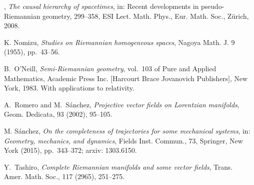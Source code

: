 \documentclass[reqno,10pt]{amsart}
\begin{document}
\begin{thebibliography}{10}
, {\em The causal hierarchy of spacetimes}, in: Recent developments in pseudo-Riemannian geometry, 299--358, ESI Lect. Math. Phys., Eur. Math. Soc., Zürich, 2008.


 {\sc K. Nomizu}, {\em 
Studies on Riemannian homogeneous spaces},
Nagoya Math. J. 9 (1955), pp.~43--56. 



{\sc B.~O'Neill}, {\em Semi-{R}iemannian geometry}, vol.~103 of Pure and
  Applied Mathematics, Academic Press Inc. [Harcourt Brace Jovanovich
  Publishers], New York, 1983.
\newblock With applications to relativity.

%
  
  {\sc A.~Romero and M.~S{\'a}nchez},
      {\em Projective vector fields on {L}orentzian manifolds},
  Geom. Dedicata, 93 (2002), 95--105.
 


 {\sc M. S\'anchez}, {\em On the completeness of trajectories for some mechanical systems}, in: {\em Geometry, mechanics, and dynamics}, Fields Inst. Commun., 73, Springer, New York (2015), pp.~343--372;
 arxiv:
1303.6150.

%
%
%

 {\sc Y.~Tashiro}, {\em Complete {R}iemannian manifolds and some vector fields}, Trans. Amer. Math. Soc., 117 (2965), 251--275.


\end{thebibliography}
\end{document}
